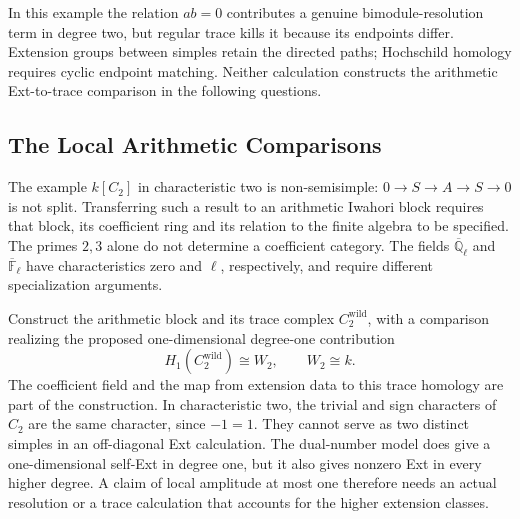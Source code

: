 In this example the relation \(ab=0\) contributes a genuine
bimodule-resolution term in degree two, but regular trace kills
it because its endpoints differ. Extension groups between simples
retain the directed paths; Hochschild homology requires cyclic
endpoint matching. Neither calculation constructs the arithmetic
Ext-to-trace comparison in the following questions.

\subsection{The Local Arithmetic Comparisons}

\begin{remark}
\label{v4-arith:bzn-rcompletion:prop:non-ss-wild}
The example \(k[C_2]\) in characteristic two is non-semisimple:
\(0\to S\to A\to S\to0\) is not split. Transferring such a result
to an arithmetic Iwahori block requires that block, its coefficient
ring and its relation to the finite algebra to be specified.
The primes \(2,3\) alone do not determine a coefficient category.
The fields \(\overline{\mathbb Q}_\ell\) and
\(\overline{\mathbb F}_\ell\) have characteristics zero and \(\ell\),
respectively, and require different specialization arguments.
\end{remark}

\begin{question}
\label{v4-arith:bzn-rcompletion:prop:R4-Ext1-p2}
Construct the arithmetic block and its trace complex
\(C_2^{\mathrm{wild}}\), with a comparison realizing the proposed
one-dimensional degree-one contribution
\begin{equation}
\label{v4-arith:bzn-rcompletion:eq:Ext1-p2}
 H_1(C_2^{\mathrm{wild}})\cong W_2,\qquad W_2\cong k.
\end{equation}
The coefficient field and the map from extension data to this trace
homology are part of the construction. In characteristic two, the
trivial and sign characters of \(C_2\) are the same character,
since \(-1=1\). They cannot serve as two distinct simples in an
off-diagonal Ext calculation. The dual-number model does give a
one-dimensional self-Ext in degree one, but it also gives nonzero
Ext in every higher degree. A claim of local amplitude at most one
therefore needs an actual resolution or a trace calculation that
accounts for the higher extension classes.
\end{question}

